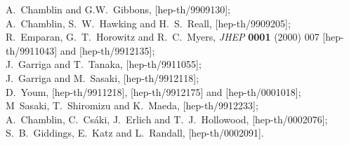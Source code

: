 \documentclass[a4paper,12pt]{article}
\begin{document}
\begin{thebibliography}{99}
A.~Chamblin and G.W.~Gibbons,
[hep-th/9909130];\\
%
A.~Chamblin, S.~W.~Hawking and H.~S.~Reall,
[hep-th/9909205];\\
%
R.~Emparan, G.~T.~Horowitz and R.~C.~Myers,
{\it JHEP} {\bf 0001} (2000) 007
[hep-th/9911043]
and
[hep-th/9912135];\\
%
J.~Garriga and T.~Tanaka,
[hep-th/9911055];\\
%
J.~Garriga and M.~Sasaki,
[hep-th/9912118];\\
%
D.~Youm,
[hep-th/9911218],
[hep-th/9912175] and [hep-th/0001018];\\
%
M~Sasaki, T.~Shiromizu and K.~Maeda,
[hep-th/9912233];\\
%
A.~Chamblin, C.~Cs\'aki, J.~Erlich and T.~J.~Hollowood,
[hep-th/0002076];\\
%
S.~B.~Giddings, E.~Katz and L.~Randall,
[hep-th/0002091].



\end{thebibliography}
\end{document}
